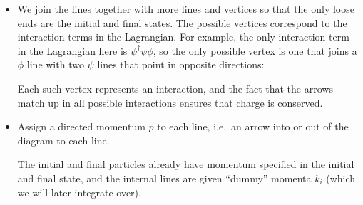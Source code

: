 \documentclass[a4paper]{article}
\begin{document}
\begin{defi}
\begin{itemize}
\begin{center}
    \end{center}
  \item We join the lines together with more lines and vertices so that the only loose ends are the initial and final states. The possible vertices correspond to the interaction terms in the Lagrangian. For example, the only interaction term in the Lagrangian here is $\psi^\dagger \psi \phi$, so the only possible vertex is one that joins a $\phi$ line with two $\psi$ lines that point in opposite directions:
    \begin{center}
    \end{center}
    Each such vertex represents an interaction, and the fact that the arrows match up in all possible interactions ensures that charge is conserved.

    \item Assign a directed momentum $p$ to each line, i.e.\ an arrow into or out of the diagram to each line.
      \begin{center}
      \end{center}
      The initial and final particles already have momentum specified in the initial and final state, and the internal lines are given ``dummy'' momenta $k_i$ (which we will later integrate over).
  \end{itemize}
\end{defi}
\end{document}
